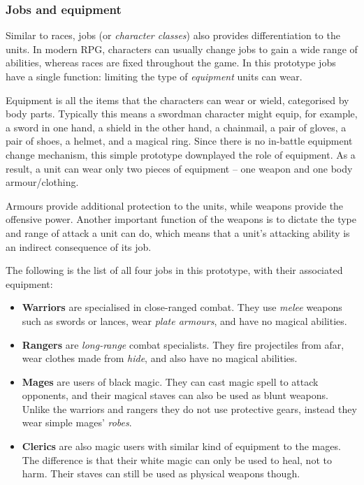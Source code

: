 \subsubsection*{Jobs and equipment}

Similar to races, jobs (or \textit{character classes}) also provides differentiation to the units. In modern RPG, characters can usually change jobs to gain a wide range of abilities, whereas races are fixed throughout the game. In this prototype jobs have a single function: limiting the type of \textit{equipment} units can wear. 

Equipment is all the items that the characters can wear or wield, categorised by body parts. Typically this means a swordman character might equip, for example, a sword in one hand, a shield in the other hand, a chainmail, a pair of gloves, a pair of shoes, a helmet, and a magical ring. Since there is no in-battle equipment change mechanism, this simple prototype downplayed the role of equipment. As a result, a unit can wear only two pieces of equipment --  one weapon and one body armour/clothing. 

Armours provide additional protection to the units, while weapons provide the offensive power. Another important function of the weapons is to dictate the type and range of attack a unit can do, which means that a unit's attacking ability is an indirect consequence of its job.

The following is the list of all four jobs in this prototype, with their associated equipment:
\begin{itemize}
	\item \textbf{Warriors} are specialised in close-ranged combat. They use \textit{melee} weapons such as swords or lances, wear \textit{plate armours}, and have no magical abilities.
	\item \textbf{Rangers} are \textit{long-range} combat specialists. They fire projectiles from afar, wear clothes made from \textit{hide}, and also have no magical abilities.
	\item \textbf{Mages} are users of black magic. They can cast magic spell to attack opponents, and their magical staves can also be used as blunt weapons. Unlike the warriors and rangers they do not use protective gears, instead they wear simple mages' \textit{robes}.  
	\item \textbf{Clerics} are also magic users with similar kind of equipment to the mages. The difference is that their white magic can only be used to heal, not to harm. Their staves can still be used as physical weapons though.
\end{itemize}


